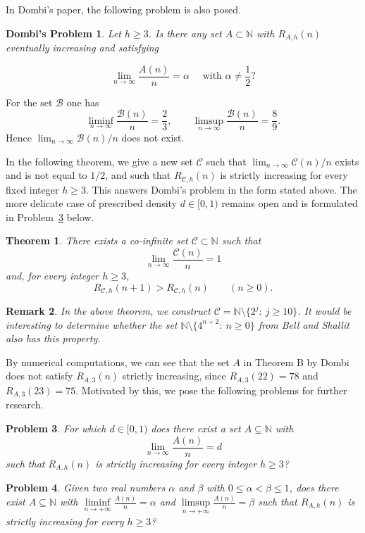 \documentclass[10pt,a4paper]{amsart}
\newtheorem{theorem}{Theorem}[section]
\newtheorem{remark}[theorem]{Remark}
\newtheorem{problem}[theorem]{Problem}
\newtheorem*{problemD}{Dombi's Problem}
\newcommand{\BaseB}{\mathcal B}
\newcommand{\NewB}{\mathcal C}
\begin{document}
In Dombi's paper, the following problem is also posed.

\begin{problemD} Let $h \geq 3$. Is there any set $A \subset \mathbb{N}$ with $R_{A,h}(n)$ eventually increasing and satisfying

$$
\lim _{n \rightarrow \infty} \frac{A(n)}{n}=\alpha \quad \text { with } \alpha \neq \frac{1}{2} ?
$$
\end{problemD}

For the set $\BaseB$ one has
\[
\liminf_{n\to\infty}\frac{\BaseB(n)}{n}=\frac23,
\qquad
\limsup_{n\to\infty}\frac{\BaseB(n)}{n}=\frac89.
\]
Hence $\lim_{n\to\infty}\BaseB(n)/n$ does not exist.

In the following theorem, we give a new set $\NewB$ such that $\lim_{n\to\infty}\NewB(n)/n$ exists and is not equal to $1/2$, and such that $R_{\NewB,h}(n)$ is strictly increasing for every fixed integer $h\ge 3$. This answers Dombi's problem in the form stated above. The more delicate case of prescribed density $d\in [0,1)$ remains open and is formulated in Problem~\ref{prob:density} below.

\begin{theorem}\label{thm:main2}
There exists a co-infinite set $\NewB \subset \mathbb{N}$ such that
\[
\lim_{n \rightarrow \infty} \frac{\NewB(n)}{n}=1
\]
and, for every integer $h\ge 3$,
\[
R_{\NewB,h}(n+1)>R_{\NewB,h}(n)\qquad(n\ge 0).
\]
\end{theorem}

\begin{remark}
In the above theorem, we construct $\NewB=\mathbb N\setminus \{2^j:\ j\ge 10\}$. It would be interesting to determine whether the set $\mathbb N\setminus \{4^{n+2}:\ n\ge 0\}$ from Bell and Shallit \cite{BellShallit} also has this property.
\end{remark}

By numerical computations, we can see that the set $A$ in Theorem B by Dombi does not satisfy
$R_{A,3}(n)$ strictly increasing, since $R_{A,3}(22)=78$ and $R_{A,3}(23)=75$. Motivated by this,
we pose the following problems for further research.

\begin{problem}\label{prob:density} For which \(d\in[0,1)\) does there exist a set \(A\subseteq\mathbb N\) with
\[
\lim_{n\to\infty}\frac{A(n)}{n}=d
\]
such that \(R_{A,h}(n)\) is strictly increasing for every integer \(h\ge 3\)?
\end{problem}

\begin{problem} Given two real numbers $\alpha$ and $\beta$ with $0\le \alpha<\beta\le 1$, does there exist $A \subseteq \mathbb{N}$ with $\liminf\limits_{n\rightarrow +\infty}\frac{A(n)}{n}=\alpha$ and
 $\limsup\limits_{n\rightarrow +\infty}\frac{A(n)}{n}=\beta$ such that $R_{A, h}(n)$ is strictly increasing for every $h \geq 3$?
\end{problem}
\end{document}
